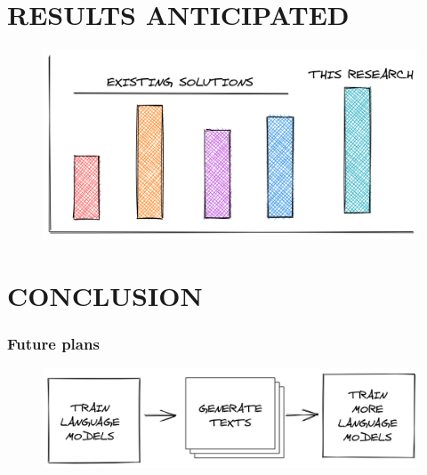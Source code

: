 \documentclass{beamer}
\begin{document}

\section{RESULTS ANTICIPATED}

\begin{frame}
\begin{figure}
	\includegraphics[width=0.9\linewidth]{images/8.png}
\end{figure}
\end{frame}


\section{CONCLUSION}

\begin{frame}
\frametitle{Future plans}
\begin{figure}
	\includegraphics[width=\linewidth]{images/9.png}
\end{figure}
\end{frame}

\end{document}
